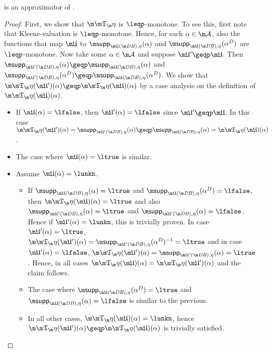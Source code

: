 \begin{proposition}
 \Ap is an approximator of \Op.
\end{proposition}
\begin{proof}
First, we show that $\Ap$ is $\leqp$-monotone. To see this, first note that Kleene-valuation is $\leqp$-monotone. Hence, for each $\alpha \in \acts$, also the functions that map $\UUU$ to $\supp_{\UUU(\db),\eta}(\alpha)$ and $\supp_{\UUU(\db),\eta}(\alpha^D)$ are $\leqp$-monotone. Now take some $\alpha \in\acts$ and suppose $\UUU'\geqp\UUU$. Then  $\supp_{\UUU'(\db),\eta}(\alpha)\geqp \supp_{\UUU(\db),\eta}(\alpha)$ and $\supp_{\UUU'(\db),\eta}(\alpha^D)\geqp \supp_{\UUU(\db),\eta}(\alpha^D)$. We show that $\Ap(\UUU')(\alpha)\geqp \Ap(\UUU)(\alpha)$ by a case analysis on the definition of $\Ap(\UUU)( \alpha)$. 
\begin{itemize}
\item If $\UUU(\alpha)=\lfalse$, then $\UUU'(\alpha)=\lfalse$ since $\UUU'\geqp\UUU$. In this case $\Ap(\UUU')(\alpha) = \supp_{\UUU'(\db),\eta}(\alpha) \geqp \supp_{\UUU(\db),\eta}(\alpha) =  \Ap(\UUU)(\alpha)$. 
\item The case where $\UUU(\alpha)=\ltrue$ is similar. 
\item Assume $\UUU(\alpha) = \lunkn$. 
\begin{itemize}
\item If $\supp_{\UUU(\db),\eta}(\alpha) = \ltrue$ and $\supp_{\UUU(\db),\eta}(\alpha^D)=\lfalse$, then $\Ap(\UUU)(\alpha)=\ltrue$ and also $\supp_{\UUU'(\db),\eta}(\alpha) = \ltrue$ and $\supp_{\UUU'(\db),\eta}(\alpha)=\lfalse$. Hence if $\UUU'(\alpha)=\lunkn$, this is trivially proven. In case $\UUU'(\alpha)=\ltrue$, $\Ap(\UUU')(\alpha) = \supp_{\UUU'(\db),\eta}(\alpha^D)^{-1}=\ltrue$ and in case $\UUU'(\alpha)=\lfalse$, $\Ap(\UUU')(a)= \supp_{\UUU'(\db),\eta}(\alpha)= \ltrue$. Hence, in all cases $\Ap(\UUU)(\alpha) = \Ap(\UUU')(\alpha)$ and the claim follows.
\item The case where $\supp_{\UUU(\db),\eta}(\alpha^D)=\ltrue$ and $\supp_{\UUU(\db),\eta}(\alpha) = \lfalse$ is similar to the previous.
\item In all other cases, $\Ap(\UUU)(\alpha)=\lunkn$, hence $\Ap(\UUU')(\alpha)\geqp \Ap(\UUU)(\alpha)$ is trivially satisfied.
\end{itemize}


\end{itemize}
\end{proof}
